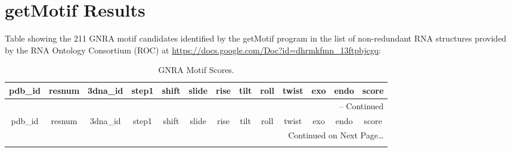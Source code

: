 \chapter{getMotif Results}
\label{appendix5a}
  Table showing the  211 GNRA  motif candidates
identified by  the getMotif program  in the list of  non-redundant RNA
structures  provided   by  the   RNA  Ontology  Consortium   (ROC)  at
\url{https://docs.google.com/Doc?id=dhrmkfmn_13ftpbjcgq}:
\footnotesize{
\begin{center}
\begin{longtable}{|c|c|c|c|c|c|c|c|c|c|c|c|c|}
\caption{GNRA Motif Scores.}
\label{tab:gnrascores}\\
\hline
pdb\_id & resnum & 3dna\_id & step1 &  shift & slide & rise & tilt & roll
& twist & exo & endo & score \\ \hline \hline
\endfirsthead

\multicolumn{13}{r}{{\tablename} \thetable{} -- Continued} \\
\hline
pdb\_id & resnum & 3dna\_id & step1 &  shift & slide & rise & tilt & roll
& twist & exo & endo & score \\ \hline \hline
\endhead

\multicolumn{13}{r}{Continued on Next Page\ldots} \\
\endfoot
\endlastfoot


\end{longtable}
\end{center}}
